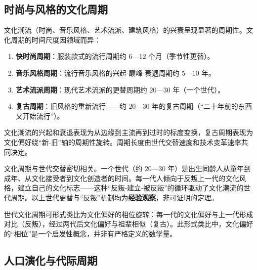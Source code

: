 \subsection{时尚与风格的文化周期}

\begin{definition}[时尚与风格的文化周期]\label{def:cultural_cycle}
文化潮流（时尚、音乐风格、艺术流派、建筑风格）的兴衰呈现显著的周期性。文化周期的时间尺度因领域而异：
\begin{enumerate}[label=(\roman*)]
    \item \textbf{快时尚周期}：服装款式的流行周期约 $6$—$12$ 个月（季节性更替）。
    \item \textbf{音乐风格周期}：流行音乐风格的兴起-巅峰-衰退周期约 $5$—$10$ 年。
    \item \textbf{艺术流派周期}：现代艺术流派的更替周期约 $20$—$30$ 年（一个世代）。
    \item \textbf{复古周期}：旧风格的重新流行——约 $20$—$30$ 年的复古周期（“二十年前的东西又开始流行”）。
\end{enumerate}
文化潮流的兴起和衰退表现为从边缘到主流再到过时的标度变换，复古周期表现为文化偏好绕“新-旧”轴的周期性旋转。周期长度由世代交替速度和技术变革速率共同决定。
\end{definition}

\begin{remark}\label{prop:generational_cycle}
文化周期与世代交替密切相关。一个世代（约 $20$—$30$ 年）是出生同龄人从童年到成年、从文化接受者到文化创造者的时间。每一代人倾向于反叛上一代的文化风格，建立自己的文化标志——这种“反叛-建立-被反叛”的循环驱动了文化潮流的世代周期。以上世代更替与“反叛”机制均为\textbf{经验观察}，非可证明的定理。

世代文化周期可形式类比为文化偏好的相位旋转：每一代的文化偏好与上一代形成对比（反叛），经过两代后文化偏好与祖辈相似（复古）。此形式类比中，文化偏好的“相位”是一个启发性概念，并非有严格定义的数学量。
\end{remark}

\subsection{人口演化与代际周期}

